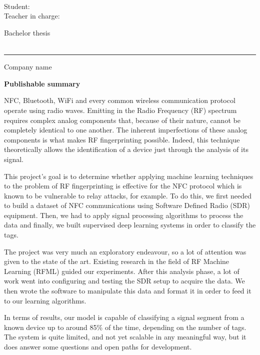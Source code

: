 \begin{flushright}
  \TBdpt\\
  \TBfiliere\\
  \TBorient\\
  Student: \TBauthor\\
  Teacher in charge: \TBsupervisor\\
\end{flushright}

\vspace{0.6cm}

\begin{center}
  {\large Bachelor thesis \TBacademicYears \\[0.2cm]}
  {\TBtitle \\[0.5cm]}
\end{center}

\hrule
\vspace{0.5cm}

{Company name}

\TBindustryName

\vspace{0.5cm}

{\bfseries Publishable summary}

{
  NFC, Bluetooth, WiFi and every common wireless communication protocol operate using radio waves. Emitting in the Radio Frequency (RF) spectrum requires complex analog components that, because of their nature, cannot be completely identical to one another. The inherent imperfections of these analog components is what makes RF fingerprinting possible. Indeed, this technique theoretically allows the identification of a device just through the analysis of its signal.

  This project's goal is to determine whether applying machine learning techniques to the problem of RF fingerprinting is effective for the NFC protocol which is known to be vulnerable to relay attacks, for example. To do this, we first needed to build a dataset of NFC communications using Software Defined Radio (SDR) equipment. Then, we had to apply signal processing algorithms to process the data and finally, we built supervised deep learning systems in order to classify the tags.

  The project was very much an exploratory endeavour, so a lot of attention was given to the state of the art. Existing research in the field of RF Machine Learning (RFML) guided our experiments. After this analysis phase, a lot of work went into configuring and testing the SDR setup to acquire the data. We then wrote the software to manipulate this data and format it in order to feed it to our learning algorithms.

  In terms of results, our model is capable of classifying a signal segment from a known device up to around 85\% of the time, depending on the number of tags. The system is quite limited, and not yet scalable in any meaningful way, but it does answer some questions and open paths for development.
}
